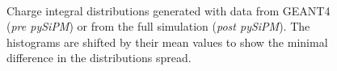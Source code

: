 \begin{figure}
	\centering
	 \\
	\caption{Charge integral distributions generated with data from GEANT4 (\textit{pre pySiPM}) or from the full simulation (\textit{post pySiPM}). The histograms are shifted by their mean values to show the minimal difference in the distributions spread.}
	\label{fig:cfr_e_dist}
\end{figure}

